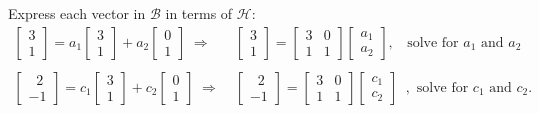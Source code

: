 \documentclass[a4paper,11pt,reqno]{amsart}
\numberwithin{equation}{section}
\begin{document}
\begin{enumerate}
\begin{center}
{{    Express each vector in \( {\mathcal{B}} \) in terms of \( {\mathcal{H}} \):
    \begin{eqnarray*}
    \begin{bmatrix} 3 \\ 1 \end{bmatrix} = a_1 \begin{bmatrix} 3 \\ 1 \end{bmatrix} + a_2 \begin{bmatrix} 0 \\ 1 \end{bmatrix} \;\Rightarrow&\;
    \begin{bmatrix} 3 \\ 1 \end{bmatrix} = \begin{bmatrix} 3  & 0 \\ 1 & 1\end{bmatrix}
    \begin{bmatrix} a_1 \\ a_2 \end{bmatrix}, \;\; \text{ solve for } a_1 \text{ and } a_2\\
    &\\
    \begin{bmatrix} \;\;2 \\ -1 \end{bmatrix} = c_1 \begin{bmatrix} 3 \\ 1 \end{bmatrix} + c_2 \begin{bmatrix} 0 \\ 1 \end{bmatrix} \;\Rightarrow&\;
    \begin{bmatrix} \;\;2 \\ -1 \end{bmatrix} = \begin{bmatrix} 3  & 0 \\ 1 & 1\end{bmatrix}
    \begin{bmatrix} c_1 \\ c_2 \end{bmatrix}\;\;, \text{ solve for } c_1 \text{ and } c_2.
    \end{eqnarray*}

    \vspace{0.3cm}
    
}}
\end{center}
\end{enumerate}
\end{document}
